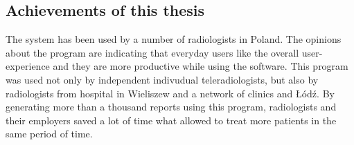 \documentclass[12pt, twoside, openany]{report}
\theoremstyle{definition}
\begin{document}
\subsection{Achievements of this thesis}
The system has been used by a number of radiologists in Poland. The opinions about the program are indicating that everyday users like the overall user-experience and they are more productive while using the software. This program was used not only by independent indivudual teleradiologists, but also by radiologists from hospital in Wieliszew and a network of clinics and Łódź.
By generating more than a thousand reports using this program, radiologists and their employers saved a lot of time what allowed to treat more patients in the same period of time.

\end{document}
